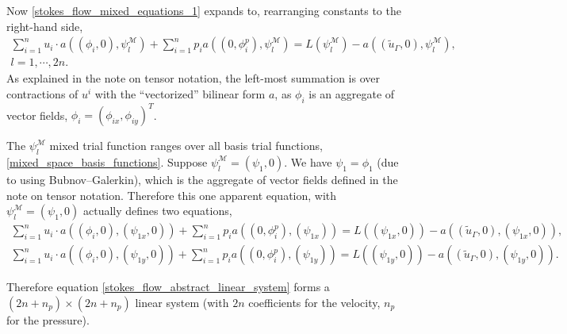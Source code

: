 Now \eqref{stokes_flow_mixed_equations_1} expands to,
rearranging constants to the right-hand side,
\begin{equation}\label{stokes_flow_abstract_linear_system}
\begin{split}
    \sum_{i=1}^n u_i\cdot a((\phi_i, 0), \psi^\mathcal{M}_l) + \sum_{i=1}^n p_ia((0, \phi_i^p), \psi^\mathcal{M}_l)
        = L(\psi^\mathcal{M}_l) - a((\tilde{u}_\Gamma, 0), \psi^\mathcal{M}_l),\\
    l = 1,\cdots,2n.
\end{split}
\end{equation}
As explained in the note on tensor notation, the left-most summation is over contractions of $u^i$ with the ``vectorized''
bilinear form $a$, as $\phi_i$ is an aggregate of vector fields, $\phi_i = (\phi_{ix}, \phi_{iy})^T$.

The $\psi_l^\mathcal{M}$ mixed trial function ranges over all basis trial functions, \ref{mixed_space_basis_functions}.
Suppose $\psi_l^\mathcal{M} = (\psi_1, 0)$. We have $\psi_1 = \phi_1$ (due to using Bubnov--Galerkin), which is the aggregate of vector fields defined in the note on tensor notation. Therefore this one apparent equation, with $\psi_l^\mathcal{M} = (\psi_1, 0)$ actually defines two equations,
\begin{align*}
    \sum_{i=1}^n u_i\cdot a((\phi_i, 0), (\psi_{1x}, 0)) + \sum_{i=1}^n p_ia((0, \phi_i^p), (\psi_{1x}))
        = L((\psi_{1x}, 0)) - a((\tilde{u}_\Gamma, 0), (\psi_{1x}, 0)),\\
    \sum_{i=1}^n u_i\cdot a((\phi_i, 0), (\psi_{1y}, 0)) + \sum_{i=1}^n p_ia((0, \phi_i^p), (\psi_{1y}))
        = L((\psi_{1y}, 0)) - a((\tilde{u}_\Gamma, 0), (\psi_{1y}, 0)).
\end{align*}

Therefore equation \eqref{stokes_flow_abstract_linear_system}
forms a $(2n + n_p) \times (2n + n_p)$ linear system (with $2n$ coefficients for the velocity, $n_p$ for the pressure).

